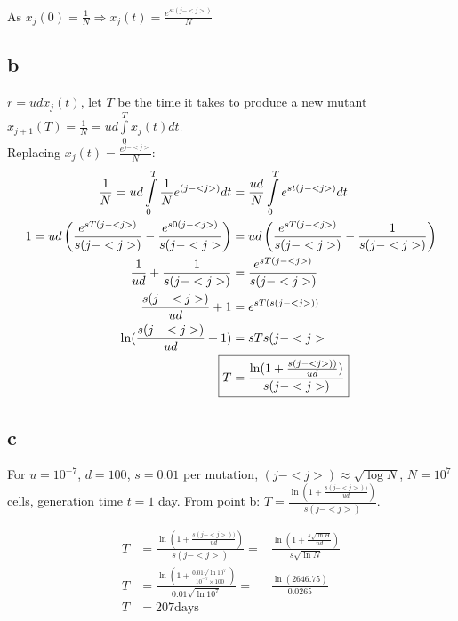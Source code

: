As $x_j(0) = \frac{1}{N} \Rightarrow \boxed{x_j(t) = \frac{e^{st(j-<j>)}}{N}} $

\subsection{b}

$r = udx_j(t)$, let $T$ be the time it takes to produce a new mutant $x_{j+1}(T) = \frac{1}{N} = ud\int\limits_{0}^{T} x_j(t)dt$.\\
Replacing $x_j(t) = \frac{e^{j-<j>}}{N} : $
\begin{align*}
\frac{1}{N} = ud\int\limits_{0}^{T} \frac{1}{N}e^{(j-<j>)}dt &= \frac{ud}{N}\int\limits_{0}^{T} e^{st(j-<j>)}dt\\
1 = ud\left(\frac{e^{sT(j-<j>)}}{s(j-<j>)}-\frac{e^{s0(j-<j>)}}{s(j-<j>}\right) &= ud\left( \frac{e^{sT(j-<j>)}}{s(j-<j>)} - \frac{1}{s(j-<j>)}\right)\\
 \frac{1}{ud}+\frac{1}{s(j-<j>)} &= \frac{e^{sT(j-<j>)}}{s(j-<j>)}\\
 \frac{s(j-<j>)}{ud}+1 &= e^{sT(s(j-<j>))}\\
 \ln (\frac{s(j-<j>)}{ud}+1) &= sTs(j-<j>\\
 \Aboxed{T &= \frac{\ln(1+\frac{s(j-<j>))}{ud})}{s(j-<j>)}}
\end{align*}

\subsection{c}

For $u=10^{-7}$, $d=100$, $s=0.01$ per mutation, $(j-<j>) \approx \sqrt{\log N}$, $N=10^{7}$ cells, generation time $t=1$ day.
From point b: $\boxed{T = \frac{\ln(1+\frac{s(j-<j>))}{ud})}{s(j-<j>)}}$.

\begin{align*}
T &= \frac{\ln(1+\frac{s(j-<j>))}{ud})}{s(j-<j>)} =& \frac{\ln (1+\frac{s\sqrt{\ln H}}{nd})}{s\sqrt{\ln N}} \\
T &= \frac{\ln (1+\frac{0.01\sqrt{\ln 10^7}}{10^{-7}\times 100})}{0.01\sqrt{\ln 10^7}} =& \frac{\ln (2646.75)}{0.0265} \\
T &= 207 \text{days}&
\end{align*}





